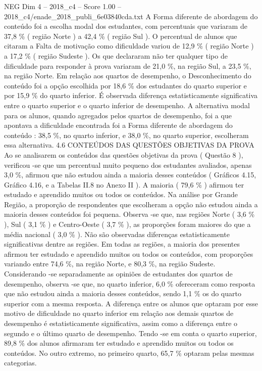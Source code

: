 \begin{textsample}{NEG Dim 4 – 2018\_c4 – Score 1.00 – 2018\_c4/enade\_2018\_publi\_6e03840cda.txt}
A Forma diferente de abordagem do conteúdo foi a escolha modal dos estudantes, com percentuais que variaram de 37,8 \% ( região Norte ) a 42,4 \% ( região Sul ).
O percentual de alunos que citaram a Falta de motivação como dificuldade variou de 12,9 \% ( região Norte ) a 17,2 \% ( região Sudeste ).
Os que declararam não ter qualquer tipo de dificuldade para responder à prova variaram de 21,0 \%, na região Sul, a 23,5 \%, na região Norte.
Em relação aos quartos de desempenho, o Desconhecimento do conteúdo foi a opção escolhida por 18,6 \% dos estudantes do quarto superior e por 15,9 \% do quarto inferior.
É observada diferença estatisticamente significativa entre o quarto superior e o quarto inferior de desempenho.
A alternativa modal para os alunos, quando agregados pelos quartos de desempenho, foi a que apontava a dificuldade encontrada foi a Forma diferente de abordagem do conteúdo : 38,5 \%, no quarto inferior, e 38,0 \%, no quarto superior, escolheram essa alternativa. 4.6 CONTEÚDOS DAS QUESTÕES OBJETIVAS DA PROVA Ao se analisarem os conteúdos das questões objetivas da prova ( Questão 8 ), verificou -se que um percentual muito pequeno dos estudantes avaliados, apenas 3,0 \%, afirmou que não estudou ainda a maioria desses conteúdos ( Gráficos 4.15, Gráfico 4.16, e a Tabelas II.8 no Anexo II ).
A maioria ( 79,6 \% ) afirmou ter estudado e aprendido muitos ou todos os conteúdos.
Na análise por Grande Região, a proporção de respondentes que escolheram a opção não estudou ainda a maioria desses conteúdos foi pequena.
Observa -se que, nas regiões Norte ( 3,6 \% ), Sul ( 3,1 \% ) e Centro-Oeste ( 3,7 \% ), as proporções foram maiores do que a média nacional ( 3,0 \% ).
Não são observadas diferenças estatisticamente significativas dentre as regiões.
Em todas as regiões, a maioria dos presentes afirmou ter estudado e aprendido muitos ou todos os conteúdos, com proporções variando entre 74,6 \%, na região Norte, e 80,3 \%, na região Sudeste.
Considerando -se separadamente as opiniões de estudantes dos quartos de desempenho, observa -se que, no quarto inferior, 6,0 \% ofereceram como resposta que não estudou ainda a maioria desses conteúdos, sendo 1,1 \% os do quarto superior com a mesma resposta.
A diferença entre os alunos que optaram por esse motivo de dificuldade no quarto inferior em relação aos demais quartos de desempenho é estatisticamente significativa, assim como a diferença entre o segundo e o último quarto de desempenho.
Tendo -se em conta o quarto superior, 89,8 \% dos alunos afirmaram ter estudado e aprendido muitos ou todos os conteúdos.
No outro extremo, no primeiro quarto, 65,7 \% optaram pelas mesmas categorias.

\end{textsample}
